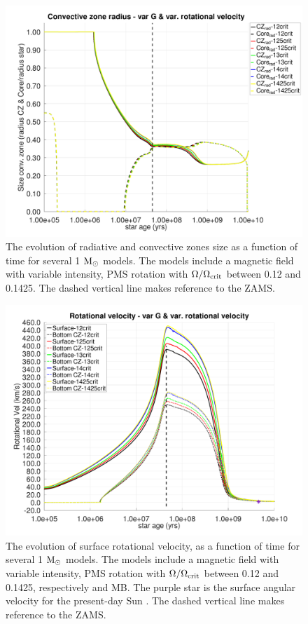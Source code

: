 \documentclass[fleqn,usenatbib]{mnras}
\begin{document}
\begin{figure}
	\includegraphics[clip,width=\columnwidth]{figures/paper2/cz_var_vel_var_g3.pdf}
    \caption{The evolution of radiative and convective zones size as a function of time for several 1 $\mathrm{M}_\odot$ models. The models include a magnetic field with variable intensity, PMS rotation with $\Omega / \Omega_{\mathrm{crit}}$ between 0.12 and 0.1425. The dashed vertical line makes reference to the ZAMS.}
    \label{fig:cz_var_vel_var_g3}
\end{figure}


\begin{figure}
	\includegraphics[clip,width=\columnwidth]{figures/paper2/rot_vel_var_vel_var_g3.pdf}
    \caption{The evolution of surface rotational velocity, as a function of time for several 1 $\mathrm{M}_\odot$ models. The models include a magnetic field with variable intensity, PMS rotation with $\Omega / \Omega_{\mathrm{crit}}$ between 0.12 and 0.1425, respectively and MB. The purple star is the surface angular velocity for the present-day Sun \citep{Gill2012}. The dashed vertical line makes reference to the ZAMS.}
    \label{fig:rot_vel_var_vel_var_g3}
\end{figure}
\end{document}
